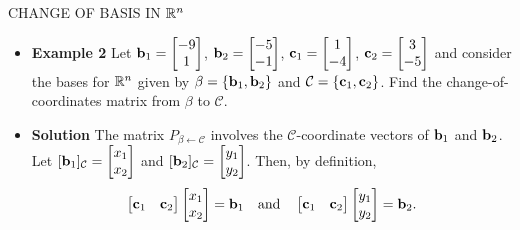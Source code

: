 \begin{frame}[shrink=12]{CHANGE OF BASIS IN $\mathbb{R}^n$}
\begin{itemize}
\item \textbf{Example 2} Let
$\mathbf{b}_1=\begin{bmatrix}-9\\1\end{bmatrix}$,
$\mathbf{b}_2=\begin{bmatrix}-5\\-1\end{bmatrix}$,
$\mathbf{c}_1=\begin{bmatrix}1\\-4\end{bmatrix}$,
$\mathbf{c}_2=\begin{bmatrix}3\\-5\end{bmatrix}$
and consider the bases for $\mathbb{R}^n$ given by $\beta=\{\mathbf{b}_1,\mathbf{b}_2\}$ and $\mathcal C=\{\mathbf{c}_1,\mathbf{c}_2\}$. Find the change-of-coordinates matrix from $\beta$ to $\mathcal C$.
\item \textbf{Solution} The matrix $P_{\beta\leftarrow\mathcal C}$ involves the $\mathcal C$-coordinate vectors of $\mathbf{b}_1$ and $\mathbf{b}_2$. Let $[\mathbf{b}_1]_{\mathcal C}=\begin{bmatrix}x_1\\x_2\end{bmatrix}$ and $[\mathbf{b}_2]_{\mathcal C}=\begin{bmatrix}y_1\\y_2\end{bmatrix}$. Then, by definition,
\[
\begin{bmatrix}\mathbf{c}_1&\mathbf{c}_2\end{bmatrix}\begin{bmatrix}x_1\\x_2\end{bmatrix}=\mathbf{b}_1
\quad\text{and}\quad
\begin{bmatrix}\mathbf{c}_1&\mathbf{c}_2\end{bmatrix}\begin{bmatrix}y_1\\y_2\end{bmatrix}=\mathbf{b}_2.
\]
\end{itemize}
\end{frame}

